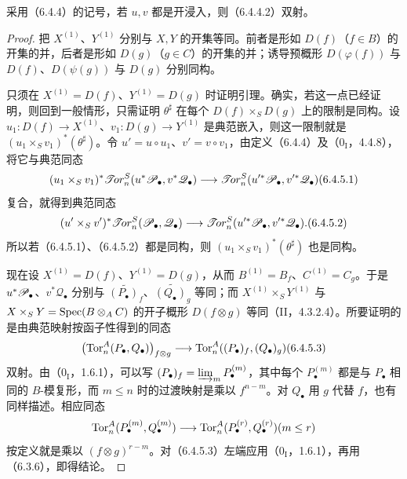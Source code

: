 采用（6.4.4）的记号，若 $u,v$ 都是开浸入，则（6.4.4.2）双射。
\begin{proof}
把 $X^{(1)}$、$Y^{(1)}$ 分别与 $X,Y$ 的开集等同。前者是形如 $D(f)$（$f\in B$）的开集的并，后者是形如 $D(g)$（$g\in C$）的开集的并；诱导预概形 $D(\varphi(f))$ 与 $D(f)$、$D(\psi(g))$ 与 $D(g)$ 分别同构。

只须在 $X^{(1)}=D(f)$、$Y^{(1)}=D(g)$ 时证明引理。确实，若这一点已经证明，则回到一般情形，只需证明 $\theta^\sharp$ 在每个 $D(f)\times_S D(g)$ 上的限制是同构。设 $u_1:D(f)\to X^{(1)}$、$v_1:D(g)\to Y^{(1)}$ 是典范嵌入，则这一限制就是 $(u_1\times_S v_1)^*(\theta^\sharp)$。令 $u'=u\circ u_1$、$v'=v\circ v_1$，由定义（6.4.4）及（$0_{\mathrm I}$，4.4.8），将它与典范同态
\begin{equation}
\begin{split}
 (u_1\times_S v_1)^*\lTor_n^S(u^*\PP_\bullet,v^*\mathscr Q_\bullet)
 \longrightarrow\lTor_n^S(u'^*\PP_\bullet,v'^*\mathscr Q_\bullet)
\end{split}\tag{6.4.5.1}
\end{equation}
复合，就得到典范同态
\begin{equation}
 (u'\times_S v')^*\lTor_n^S(\PP_\bullet,\mathscr Q_\bullet)
 \longrightarrow\lTor_n^S(u'^*\PP_\bullet,v'^*\mathscr Q_\bullet).
 \tag{6.4.5.2}
\end{equation}
所以若（6.4.5.1）、（6.4.5.2）都是同构，则 $(u_1\times_S v_1)^*(\theta^\sharp)$ 也是同构。

现在设 $X^{(1)}=D(f)$、$Y^{(1)}=D(g)$，从而 $B^{(1)}=B_f$、$C^{(1)}=C_g$。于是 $u^*\mathscr P_\bullet$、$v^*\mathscr Q_\bullet$ 分别与 $\widetilde{(P_\bullet)_f}$、$\widetilde{(Q_\bullet)_g}$ 等同；而 $X^{(1)}\times_S Y^{(1)}$ 与 $X\times_S Y=\operatorname{Spec}(B\otimes_A C)$ 的开子概形 $D(f\otimes g)$ 等同（II，4.3.2.4）。所要证明的是由典范映射按函子性得到的同态
\begin{equation}
 \bigl(\Tor_n^A(P_\bullet,Q_\bullet)\bigr)_{f\otimes g}
 \longrightarrow\Tor_n^A((P_\bullet)_f,(Q_\bullet)_g)
 \tag{6.4.5.3}
\end{equation}
双射。由（$0_{\mathrm I}$，1.6.1），可以写
$(P_\bullet)_f=\varinjlim_m P_\bullet^{(m)}$，其中每个 $P_\bullet^{(m)}$ 都是与 $P_\bullet$ 相同的 $B$-模复形，而 $m\leq n$ 时的过渡映射是乘以 $f^{n-m}$。对 $Q_\bullet$ 用 $g$ 代替 $f$，也有同样描述。相应同态
\[
 \operatorname{Tor}_n^A(P_\bullet^{(m)},Q_\bullet^{(m)})
 \longrightarrow\operatorname{Tor}_n^A(P_\bullet^{(r)},Q_\bullet^{(r)})
 (m\leq r)
\]
按定义就是乘以 $(f\otimes g)^{r-m}$。对（6.4.5.3）左端应用（$0_{\mathrm I}$，1.6.1），再用（6.3.6），即得结论。
\end{proof}

